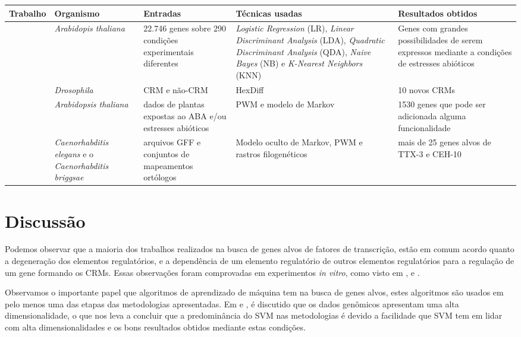 \begin{tabularx}{\textwidth}{ |X|X|X|X|X| }    \hline
		  	Trabalho      & Organismo    & Entradas     & Técnicas usadas & Resultados obtidos       \\ \hline \hline

    \cite{Lan2007}     		   & \textit{Arabidopis thaliana}  & 22.746 genes sobre 290 condições experimentais diferentes   & \textit{Logistic Regression} (LR), \textit{Linear Discriminant Analysis} (LDA), \textit{Quadratic Discriminant Analysis} (QDA), \textit{Naive Bayes} (NB) e \textit{K-Nearest Neighbors} (KNN)& Genes com grandes possibilidades de serem expressos mediante a condições de estresses abióticos \\ \hline
    \cite{Chan2005}            & \textit{Drosophila}  & CRM e não-CRM   & HexDiff & 10 novos CRMs\\ \hline
    \cite{Zhang2005}           & \textit{Arabidopsis thaliana}  & dados de plantas expostas ao ABA e/ou estresses abióticos & PWM e modelo de Markov & 1530 genes que pode ser adicionada alguma funcionalidade \\ \hline
    \cite{Bigelow2004CisOrtho} & \textit{Caenorhabditis elegans} e o \textit{Caenorhabditis briggsae}  & arquivos GFF e conjuntos de mapeamentos ortólogos  & Modelo oculto de Markov, PWM e rastros filogenéticos & mais de 25 genes alvos de TTX-3 e CEH-10  \\ \hline           

\end{tabularx}

\section{Discussão}

Podemos observar que a maioria dos trabalhos realizados na busca de genes alvos de fatores de transcrição, estão em comum acordo quanto a degeneração dos elementos regulatórios, e a dependência de um elemento regulatório de outros elementos regulatórios para a regulação de um gene formando os CRMs. Essas observações foram comprovadas em experimentos \textit{in vitro}, como visto em \cite{Davidson1983},\cite{Priest2009} e \cite{Zhang2005}. 

Observamos o importante papel que algoritmos de aprendizado de máquina tem na busca de genes alvos, estes algoritmos são usados em pelo menos uma das etapas das metodologias apresentadas. Em \cite{Holloway2008} e \cite{Lan2007}, é discutido que os dados genômicos apresentam uma alta dimensionalidade, o que nos leva a concluir que a predominância do SVM nas metodologias é devido a facilidade que SVM tem em lidar com alta dimensionalidades e os bons resultados obtidos mediante estas condições.

